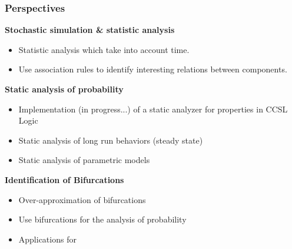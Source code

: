 \begin{frame}
 \frametitle{Perspectives}
 
 \textbf{Stochastic simulation \& statistic analysis}
 \begin{itemize}
  \item Statistic analysis which take into account time.
  \item Use association rules to identify interesting relations between components.
 \end{itemize}

 
 \textbf{Static analysis of probability}
 \begin{itemize}
  \item Implementation (in progress...) of a static analyzer for properties in  CCSL Logic
  \item Static analysis of long run behaviors (steady state)
  \item Static analysis of parametric models
 \end{itemize}

 
 \textbf{Identification of Bifurcations}
 \begin{itemize}
  \item Over-approximation of bifurcations
  \item Use bifurcations for the analysis of probability 
  \item Applications for 
  
 \end{itemize}

 
 
% 
%  
% 
 
\end{frame}

